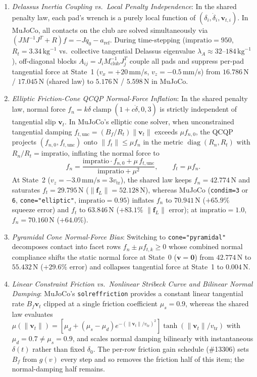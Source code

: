 \documentclass[11pt,a4paper]{article}
\begin{document}
\begin{enumerate}[leftmargin=*,noitemsep]
\item \textit{Delassus Inertia Coupling vs.\ Local Penalty Independence}: In the shared penalty law, each pad's wrench is a purely local function of $(\delta_i, \dot{\delta}_i, \mathbf{v}_{t,i})$. In MuJoCo, all contacts on the club are solved simultaneously via $(J M^{-1} J^T + R) f = -J \ddot{q}_0 - a_{\mathrm{ref}}$. During time-stepping ($\mathrm{impratio} = 950$, $R_t = 3.34\,\mathrm{kg}^{-1}$ vs.\ collective tangential Delassus eigenvalue $\lambda_A \approx 32\text{--}184\,\mathrm{kg}^{-1}$), off-diagonal blocks $A_{ij} = J_i M_{\mathrm{club}}^{-1} J_j^T$ couple all pads and suppress per-pad tangential force at State~1 ($v_x = +20$\,mm/s, $v_z = -0.5$\,mm/s) from $16.786$\,N / $17.045$\,N (shared law) to $5.176$\,N / $5.598$\,N in MuJoCo.
\item \textit{Elliptic Friction-Cone QCQP Normal-Force Inflation}: In the shared penalty law, normal force $f_n = k \delta \operatorname{clamp}(1 + c\dot{\delta}, 0, 3)$ is strictly independent of tangential slip $\mathbf{v}_t$. In MuJoCo's elliptic cone solver, when unconstrained tangential damping $f_{t,\mathrm{unc}} = (B_f / R_t)\|\mathbf{v}_t\|$ exceeds $\mu f_{n,0}$, the QCQP projects $(f_{n,0}, f_{t,\mathrm{unc}})$ onto $\|f_t\| \le \mu f_n$ in the metric $\operatorname{diag}(R_n, R_t)$ with $R_n / R_t = \mathrm{impratio}$, inflating the normal force to
\begin{equation}
f_n = \frac{\mathrm{impratio}\cdot f_{n,0} + \mu\, f_{t,\mathrm{unc}}}{\mathrm{impratio} + \mu^2}, \qquad f_t = \mu f_n.
\end{equation}
At State~2 ($v_z = -3.0\,\mathrm{mm/s} = 3 v_{\mathrm{tr}}$), the shared law keeps $f_n = 42.774$\,N and saturates $f_t = 29.795$\,N ($\|\mathbf{f}_L\| = 52.128$\,N), whereas MuJoCo (\texttt{condim=3} or \texttt{6}, \texttt{cone="elliptic"}, $\mathrm{impratio} = 0.95$) inflates $f_n$ to $70.941$\,N ($+65.9\%$ squeeze error) and $f_t$ to $63.846$\,N ($+83.1\%$ $\|\mathbf{f}_L\|$ error); at $\mathrm{impratio} = 1.0$, $f_n = 70.160$\,N ($+64.0\%$).
\item \textit{Pyramidal Cone Normal-Force Bias}: Switching to \texttt{cone="pyramidal"} decomposes contact into facet rows $f_n \pm \mu f_{t,k} \ge 0$ whose combined normal compliance shifts the static normal force at State~0 ($\mathbf{v} = \mathbf{0}$) from $42.774$\,N to $55.432$\,N ($+29.6\%$ error) and collapses tangential force at State~1 to $0.004$\,N.
\item \textit{Linear Constraint Friction vs.\ Nonlinear Stribeck Curve and Bilinear Normal Damping}: MuJoCo's \texttt{solreffriction} provides a constant linear tangential rate $B_f \mathbf{v}_t$ clipped at a single friction coefficient $\mu_s = 0.9$, whereas the shared law evaluates $\mu(\|\mathbf{v}_t\|) = [\mu_d + (\mu_s - \mu_d)e^{-(\|\mathbf{v}_t\|/v_{\mathrm{tr}})^2}]\tanh(\|\mathbf{v}_t\|/v_{\mathrm{tr}})$ with $\mu_d = 0.7 \ne \mu_s = 0.9$, and scales normal damping bilinearly with instantaneous $\delta(t)$ rather than fixed $\delta_0$. The per-row friction gain schedule (\#13306) sets $B_f$ from $g(v)$ every step and so removes the friction half of this item; the normal-damping half remains.

\end{enumerate}
\end{document}
